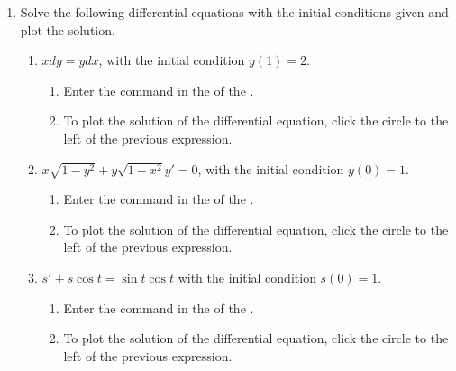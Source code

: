\begin{enumerate}[leftmargin=*]
\item Solve the following differential equations with the initial conditions given and plot the solution.
      \begin{enumerate}
      \item $xdy=ydx$, with the initial condition $y(1)=2$.
            \begin{indication}
            \begin{enumerate}
            \item Enter the command  in the  of the .
            \item To plot the solution of the differential equation, click the circle to the left of the previous expression.
            \end{enumerate}
            \end{indication}

      \item $x\sqrt{1-y^2}+y\sqrt{1-x^2} y'=0$, with the initial condition $y(0)=1$.
            \begin{indication}
            \begin{enumerate}
            \item Enter the command  in the  of the .
            \item To plot the solution of the differential equation, click the circle to the left of the previous expression.
            \end{enumerate}
            \end{indication}

      \item $s'+s\cos t=\sin t\cos t$ with the initial condition $s(0)=1$.
            \begin{indication}
            \begin{enumerate}
            \item Enter the command  in the  of the .
            \item To plot the solution of the differential equation, click the circle to the left of the previous expression.
            \end{enumerate}
            \end{indication}


\end{enumerate}
\end{enumerate}
